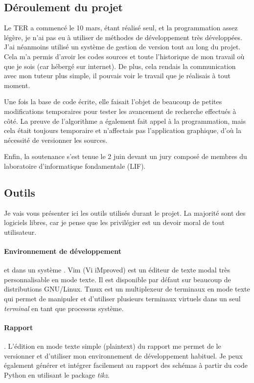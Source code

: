 \subsection{Déroulement du projet}

Le TER a commencé le 10 mars, étant réalisé seul, et la programmation assez
légère, je n'ai pas eu à utiliser de méthodes de développement très
développées. J'ai néanmoins utilisé un système de gestion de version tout au
long du projet. Cela m'a permis d'avoir les codes sources et toute l'historique
de mon travail où que je sois (car hébergé sur internet). De plus, cela rendais
la communication avec mon tuteur plus simple, il pouvais voir le travail que je
réalisais à tout moment.

Une fois la base de code écrite, elle faisait l'objet de beaucoup de petites
modifications temporaires pour tester les avancement de recherche effectués à
côté. La preuve de l'algorithme a également fait appel à la programmation, mais
cela était toujours temporaire et n'affectais pas l'application graphique, d'où
la nécessité de versionner les sources.

Enfin, la soutenance s'est tenue le 2 juin devant un jury composé de membres du
laboratoire d'informatique fondamentale (LIF).

\subsection{Outils}

Je vais vous présenter ici les outils utilisés durant le projet. La majorité
sont des logiciels libres, car je pense que les privilégier est un devoir moral
de tout utilisateur.

\paragraph{Environnement de développement}  et  dans un
système . Vim (Vi iMproved) est un éditeur de texte modal très
personnalisable en mode texte. Il est disponible par défaut sur beaucoup de
distributions GNU/Linux. Tmux est un multiplexeur de terminaux en mode texte
qui permet de manipuler et d'utiliser plusieurs terminaux virtuels dans un seul
\textit{terminal} en tant que processus système.

\paragraph{Rapport} \outil{\LaTeX}. L'édition en mode texte simple (plaintext)
du rapport me permet de le versionner et d'utiliser mon environnement de
développement habituel. Je peux également générer et intégrer facilement au
rapport des schémas à partir du code Python en utilisant le package
\textit{tikz}.

